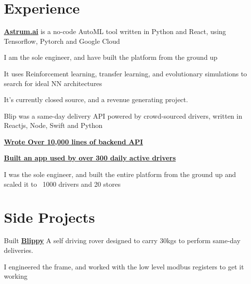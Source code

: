 \documentclass[]{deedy-resume-openfont}
\begin{document}
\begin{minipage}[t]{0.66\textwidth} 


\section{Experience}
\vspace{\topsep} %
\begin{tightemize}
\item \textbf{\href{https://www.astrum.ai}{Astrum.ai}} is a no-code AutoML tool written in Python and React, using Tensorflow, Pytorch and Google Cloud
\item I am the sole engineer, and have built the platform from the ground up
\item It uses Reinforcement learning, transfer learning, and evolutionary simulations to search for ideal NN architectures
\item It's currently closed source, and a revenue generating project.
\end{tightemize}
\sectionsep

\vspace{\topsep} %
\begin{tightemize}
\item Blip was a same-day delivery API powered by crowd-sourced drivers, written in Reactjs, Node, Swift and Python
\item \textbf{\href{https://blip-live.firebaseapp.com/#intro}{Wrote Over 10,000 lines of backend API}}
\item \textbf{\href{https://apps.apple.com/ca/app/blip-driver/id1397140753}{Built an app used by over 300 daily active drivers}}
\item I was the sole engineer, and built the entire platform from the ground up and scaled it to ~1000 drivers and 20 stores
\end{tightemize}
\sectionsep



\section{Side Projects}
Built \textbf{\href{https://drive.google.com/drive/u/3/folders/16rhXzpnnE2r-Tf5yzjvB5i6v06zM74ir}{Blippy}} A self driving rover designed to carry 30kgs to perform same-day deliveries.
\item I engineered the frame, and worked with the low level modbus registers to get it working
\sectionsep


\end{minipage}
\end{document}
